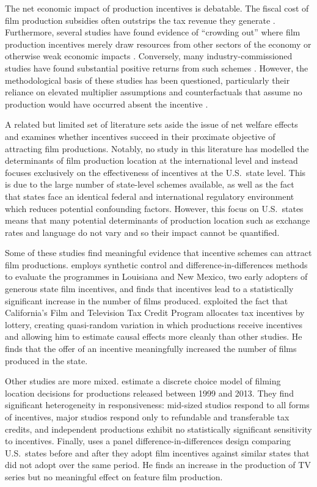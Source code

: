 The net economic impact of production incentives is debatable. The fiscal cost of film production subsidies often outstrips the tax revenue they generate \citep{luther2010, tannenwald2010, owens2020}. Furthermore, several studies have found evidence of ``crowding out'' where film production incentives merely draw resources from other sectors of the economy \citep{calcagno2004} or otherwise weak economic impacts \citep{thom2018, button2019}. Conversely, many industry-commissioned studies have found substantial positive returns from such schemes \citep{ey2009, olsberg2023}. However, the methodological basis of these studies has been questioned, particularly their reliance on elevated multiplier assumptions and counterfactuals that assume no production would have occurred absent the incentive \citep{button2021}.

A related but limited set of literature sets aside the issue of net welfare effects and examines whether incentives succeed in their proximate objective of attracting film productions. Notably, no study in this literature has modelled the determinants of film production location at the international level and instead focuses exclusively on the effectiveness of incentives at the U.S.\ state level. This is due to the large number of state-level schemes available, as well as the fact that states face an identical federal and international regulatory environment which reduces potential confounding factors. However, this focus on U.S.\ states means that many potential determinants of production location such as exchange rates and language do not vary and so their impact cannot be quantified.

Some of these studies find meaningful evidence that incentive schemes can attract film productions. \citet{button2021} employs synthetic control and difference-in-differences methods to evaluate the programmes in Louisiana and New Mexico, two early adopters of generous state film incentives, and finds that incentives lead to a statistically significant increase in the number of films produced. \citet{workman2021} exploited the fact that California's Film and Television Tax Credit Program allocates tax incentives by lottery, creating quasi-random variation in which productions receive incentives and allowing him to estimate causal effects more cleanly than other studies. He finds that the offer of an incentive meaningfully increased the number of films produced in the state.

Other studies are more mixed. \citet{owens2020} estimate a discrete choice model of filming location decisions for productions released between 1999 and 2013. They find significant heterogeneity in responsiveness: mid-sized studios respond to all forms of incentives, major studios respond only to refundable and transferable tax credits, and independent productions exhibit no statistically significant sensitivity to incentives. Finally, \citet{button2019} uses a panel difference-in-differences design comparing U.S.\ states before and after they adopt film incentives against similar states that did not adopt over the same period. He finds an increase in the production of TV series but no meaningful effect on feature film production.

